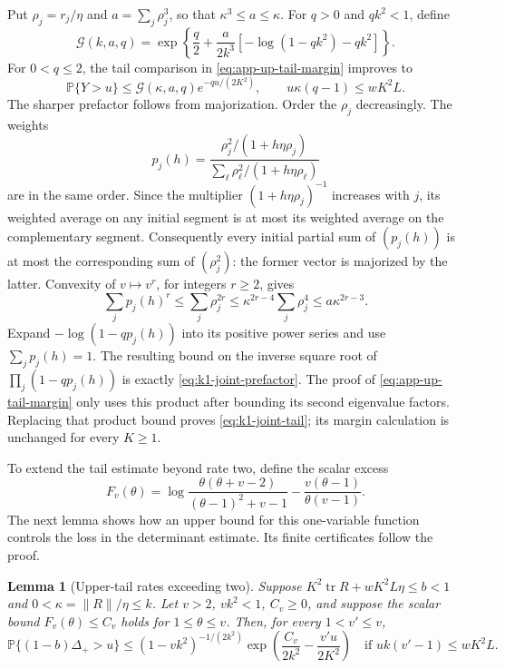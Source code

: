 \documentclass[11pt,a4paper]{article}
\newcommand{\PP}{\mathbb P}
\numberwithin{equation}{section}
\newtheorem{lemma}[theorem]{Lemma}
\begin{document}
Put $\rho_j=r_j/\eta$ and $a=\sum_j\rho_j^3$, so that
$\kappa^3\le a\le\kappa$. For $q>0$ and $qk^2<1$, define
\begin{equation}\label{eq:k1-joint-prefactor}
 \mathcal G(k,a,q)=\exp\!\left\{
 \frac q2+\frac{a}{2k^3}
       [-\log(1-qk^2)-qk^2]\right\}.
\end{equation}
For $0<q\le2$, the tail comparison in \eqref{eq:app-up-tail-margin} improves to
\begin{equation}\label{eq:k1-joint-tail}
 \PP\{Y>u\}\le\mathcal G(\kappa,a,q)e^{-qu/(2K^2)},
 \qquad u\kappa(q-1)\le wK^2L.
\end{equation}
The sharper prefactor follows from majorization.
Order the $\rho_j$ decreasingly. The weights
\[
 p_j(h)=\frac{\rho_j^2/(1+h\eta\rho_j)}
                   {\sum_\ell\rho_\ell^2/(1+h\eta\rho_\ell)}
\]
are in the same order. Since the multiplier $(1+h\eta\rho_j)^{-1}$
increases with $j$, its weighted average on any initial segment is
at most its weighted average on the complementary segment.
Consequently every initial partial sum of $(p_j(h))$ is at most the
corresponding sum of $(\rho_j^2)$: the former vector is majorized by
the latter. Convexity of $v\mapsto v^r$, for integers $r\ge2$, gives
\[
 \sum_jp_j(h)^r\le\sum_j\rho_j^{2r}
 \le\kappa^{2r-4}\sum_j\rho_j^4
 \le a\kappa^{2r-3}.
\]
Expand $-\log(1-qp_j(h))$ into its positive power series and use
$\sum_jp_j(h)=1$. The resulting bound on the inverse square root of
$\prod_j(1-qp_j(h))$ is exactly \eqref{eq:k1-joint-prefactor}.
The proof of \eqref{eq:app-up-tail-margin} only uses this product after
bounding its second eigenvalue factors. Replacing that product bound
proves \eqref{eq:k1-joint-tail}; its margin calculation is unchanged
for every $K\ge1$.

To extend the tail estimate beyond rate two, define the scalar excess
\[
 F_v(\theta)=\log\frac{\theta(\theta+v-2)}{(\theta-1)^2+v-1}
            -\frac{v(\theta-1)}{\theta(v-1)}.
\]
The next lemma shows how an upper bound for this one-variable function
controls the loss in the determinant estimate. Its finite certificates
follow the proof.

\begin{lemma}[Upper-tail rates exceeding two]
\label{app:upper-tail-extension}
Suppose $K^2\operatorname{tr}R+wK^2L\eta\le b<1$ and
$0<\kappa=\|R\|/\eta\le k$.
Let $v>2$, $vk^2<1$, $C_v\ge0$, and suppose the scalar bound
$F_v(\theta)\le C_v$ holds for $1\le\theta\le v$.
Then, for every $1<v'\le v$,
\begin{equation}\label{eq:app-upper-extended-tail}
 \mathbb P\{(1-b)\Delta_+>u\}
 \le (1-vk^2)^{-1/(2k^2)}
       \exp\!\left(\frac{C_v}{2k^2}-\frac{v'u}{2K^2}\right)
 \quad\text{if }uk(v'-1)\le wK^2L.
\end{equation}
\end{lemma}
\end{document}
